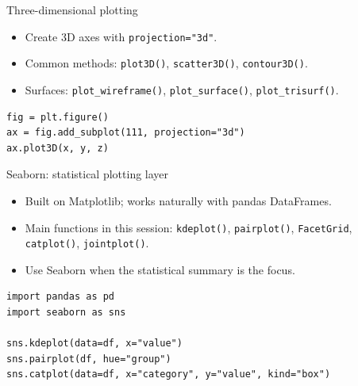 \documentclass[aspectratio=43,11pt]{beamer}
\begin{document}
\begin{frame}[fragile]{Three-dimensional plotting}
\begin{itemize}
  \item Create 3D axes with \texttt{projection="3d"}.
  \item Common methods: \texttt{plot3D()}, \texttt{scatter3D()}, \texttt{contour3D()}.
  \item Surfaces: \texttt{plot\_wireframe()}, \texttt{plot\_surface()}, \texttt{plot\_trisurf()}.
\end{itemize}

\begin{lstlisting}
fig = plt.figure()
ax = fig.add_subplot(111, projection="3d")
ax.plot3D(x, y, z)
\end{lstlisting}
\end{frame}

\begin{frame}[fragile]{Seaborn: statistical plotting layer}
\begin{itemize}
  \item Built on Matplotlib; works naturally with pandas DataFrames.
  \item Main functions in this session: \texttt{kdeplot()}, \texttt{pairplot()}, \texttt{FacetGrid}, \texttt{catplot()}, \texttt{jointplot()}.
  \item Use Seaborn when the statistical summary is the focus.
\end{itemize}

\begin{lstlisting}
import pandas as pd
import seaborn as sns

sns.kdeplot(data=df, x="value")
sns.pairplot(df, hue="group")
sns.catplot(data=df, x="category", y="value", kind="box")
\end{lstlisting}
\end{frame}
\end{document}
